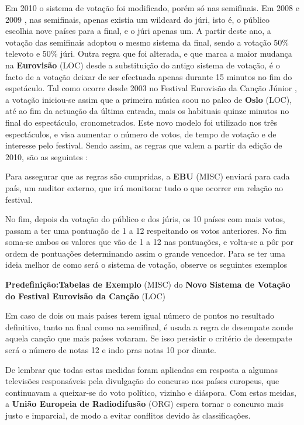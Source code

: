 \documentclass[12pt,a4paper]{article}
\begin{document}
Em 2010 o sistema de votação foi modificado, porém só nas semifinais. Em 2008 e 2009 , nas semifinais, apenas existia um wildcard do júri, isto é, o público escolhia nove países para a final, e o júri apenas um. A partir deste ano, a votação das semifinais adoptou o mesmo sistema da final, sendo a votação 50\% televoto e 50\% júri. Outra regra que foi alterada, e que marca a maior mudança na \textbf{Eurovisão} (LOC) desde a substituição do antigo sistema de votação, é o facto de a votação deixar de ser efectuada apenas durante 15 minutos no fim do espetáculo. Tal como ocorre desde 2003 no Festival Eurovisão da Canção Júnior , a votação iniciou-se assim que a primeira música soou no palco de \textbf{Oslo} (LOC), até ao fim da actuação da última entrada, mais os habituais quinze minutos no final do espectáculo, cronometrados. Este novo modelo foi utilizado nos três espectáculos, e visa aumentar o número de votos, de tempo de votação e de interesse pelo festival. Sendo assim, as regras que valem a partir da edição de 2010, são as seguintes :

Para assegurar que as regras são cumpridas, a \textbf{EBU} (MISC) enviará para cada país, um auditor externo, que irá monitorar tudo o que ocorrer em relação ao festival.

No fim, depois da votação do público e dos júris, os 10 países com mais votos, passam a ter uma pontuação de 1 a 12 respeitando os votos anteriores. No fim soma-se ambos os valores que vão de 1 a 12 nas pontuações, e volta-se a pôr por ordem de pontuações determinando assim o grande vencedor. Para se ter uma ideia melhor de como será o sistema de votação, observe os seguintes exemplos

\textbf{Predefinição:Tabelas de Exemplo} (MISC) do \textbf{Novo Sistema de Votação do Festival Eurovisão da Canção} (LOC)

Em caso de dois ou mais países terem igual número de pontos no resultado definitivo, tanto na final como na semifinal, é usada a regra de desempate aonde aquela canção que mais países votaram. Se isso persistir o critério de desempate será o número de notas 12 e indo pras notas 10 por diante.

De lembrar que todas estas medidas foram aplicadas em resposta a algumas televisões responsáveis pela divulgação do concurso nos países europeus, que continuavam a queixar-se do voto político, vizinho e diáspora. Com estas meidas, a \textbf{União Europeia de Radiodifusão} (ORG) espera tornar o concurso mais justo e imparcial, de modo a evitar conflitos devido às classificações.
\end{document}

